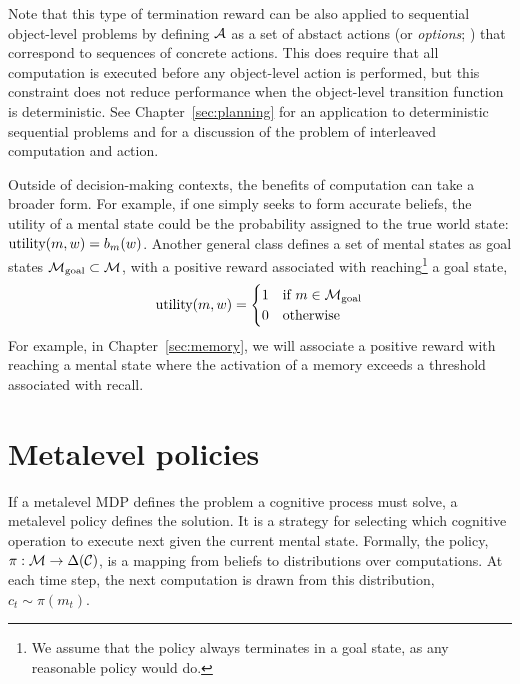 Note that this type of termination reward can be also applied to sequential object-level problems by defining $\mathcal{A}$ as a set of abstact actions (or \emph{options}; \citealp{sutton1999mdps}) that correspond to sequences of concrete actions. This does require that all computation is executed before any object-level action is performed, but this constraint does not reduce performance when the object-level transition function is deterministic. See Chapter~\ref{sec:planning} for an application to deterministic sequential problems and  for a discussion of the problem of interleaved computation and action.

Outside of decision-making contexts, the benefits of computation can take a broader form. For example, if one simply seeks to form accurate beliefs, the utility of a mental state could be the probability assigned to the true world state: $\text{utility}(m, w) = b_m(w)$. Another general class defines a set of mental states as goal states $\mathcal{M}_{\mathrm{goal}} \subset \mathcal{M}$, with a positive reward associated with reaching\footnote{We assume that the policy always terminates in a goal state, as any reasonable policy would do.} a goal state,
%
\begin{equation}\label{eq:goal-term}
  \text{utility}(m, w) = \begin{cases}
    1 &\text{if } m \in \mathcal{M}_{\mathrm{goal}} \\
    0 &\text{otherwise}
  \end{cases}
\end{equation}
%
For example, in Chapter~\ref{sec:memory}, we will associate a positive reward with reaching a mental state where the activation of a memory exceeds a threshold associated with recall.


\section{Metalevel policies}\label{sec:metamdp-policy}

If a metalevel MDP defines the problem a cognitive process must solve, a metalevel policy defines the solution. It is a strategy for selecting which cognitive operation to execute next given the current mental state. Formally, the policy, $\pi: \mathcal{M} \rightarrow \Delta(\mathcal{C})$, is a mapping from beliefs to distributions over computations. At each time step, the next computation is drawn from this distribution, $c_t \sim \pi(m_t)$.

